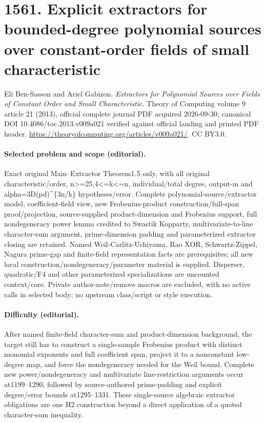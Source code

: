 \documentclass[10pt]{article}
\theoremstyle{definition}
\numberwithin{equation}{section}
\begin{document}
\begingroup\raggedright
\section*{1561. Explicit extractors for bounded-degree polynomial sources over constant-order fields of small characteristic}
Eli Ben-Sasson and Ariel Gabizon. \emph{Extractors for Polynomial Sources over Fields of Constant Order and Small Characteristic}. Theory of Computing volume 9 article 21 (2013), official complete journal PDF acquired 2026-09-30; canonical DOI 10.4086/toc.2013.v009a021 verified against official landing and printed PDF header. \url{https://theoryofcomputing.org/articles/v009a021/}. CC BY3.0.
\paragraph{Selected problem and scope (editorial).} Exact original Main--Extractor Theorem1.5 only, with all original characteristic/order, n>=25,4<=k<=n, individual/total degree, output-m and alpha=3D(pd)\textasciicircum{}\{3n/k\} hypotheses/error. Complete polynomial-source/extractor model, coefficient-field view, new Frobenius-product construction/full-span proof/projection, source-supplied product-dimension and Frobenius support, full nondegeneracy power lemma credited to Swastik Kopparty, multivariate-to-line character-sum argument, prime-dimension padding and parameterized extractor closing are retained. Named Weil-Carlitz-Uchiyama, Rao XOR, Schwartz-Zippel, Nagura prime-gap and finite-field representation facts are prerequisites; all new local construction/nondegeneracy/parameter material is supplied. Disperser, quadratic/F4 and other parameterized specializations are uncounted context/core. Private author-note/remove macros are excluded, with no active calls in selected body; no upstream class/script or style execution.
\paragraph{Difficulty (editorial).} After named finite-field character-sum and product-dimension background, the target still has to construct a single-sample Frobenius product with distinct monomial exponents and full coefficient span, project it to a nonconstant low-degree map, and force the nondegeneracy needed for the Weil bound. Complete new power/nondegeneracy and multivariate line-restriction arguments occur at1199–1290, followed by source-authored prime-padding and explicit degree/error bounds at1295–1331. These single-source algebraic extractor obligations are one H2 construction beyond a direct application of a quoted character-sum inequality.
\end{document}
